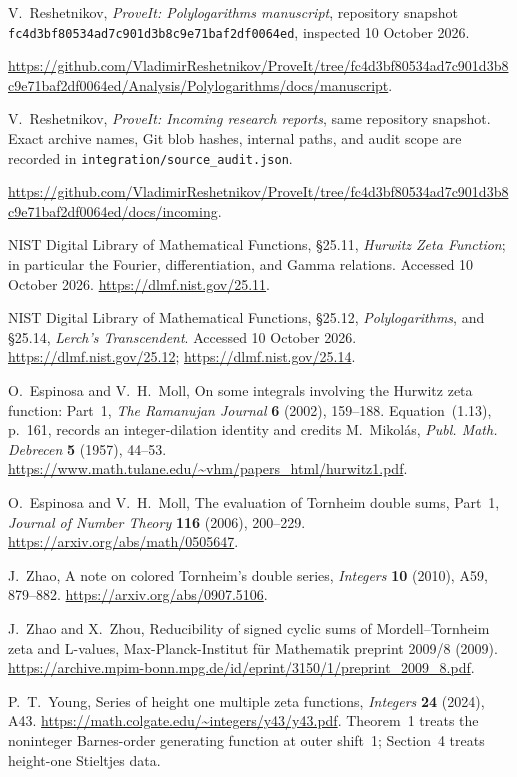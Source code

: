 V.~Reshetnikov, \emph{ProveIt: Polylogarithms manuscript}, repository
snapshot \nolinkurl{fc4d3bf80534ad7c901d3b8c9e71baf2df0064ed}, inspected
10 October 2026.\par
\url{https://github.com/VladimirReshetnikov/ProveIt/tree/fc4d3bf80534ad7c901d3b8c9e71baf2df0064ed/Analysis/Polylogarithms/docs/manuscript}.

V.~Reshetnikov, \emph{ProveIt: Incoming research reports}, same repository
snapshot.  Exact archive names, Git blob hashes, internal paths, and audit
scope are recorded in \nolinkurl{integration/source_audit.json}.\par
\url{https://github.com/VladimirReshetnikov/ProveIt/tree/fc4d3bf80534ad7c901d3b8c9e71baf2df0064ed/docs/incoming}.

NIST Digital Library of Mathematical Functions, \S25.11,
\emph{Hurwitz Zeta Function}; in particular the Fourier, differentiation,
and Gamma relations.  Accessed 10 October 2026.
\url{https://dlmf.nist.gov/25.11}.

NIST Digital Library of Mathematical Functions, \S25.12,
\emph{Polylogarithms}, and \S25.14, \emph{Lerch's Transcendent}.
Accessed 10 October 2026.
\url{https://dlmf.nist.gov/25.12};
\url{https://dlmf.nist.gov/25.14}.

O.~Espinosa and V.~H.~Moll,
On some integrals involving the Hurwitz zeta function: Part~1,
\emph{The Ramanujan Journal} \textbf{6} (2002), 159--188.
Equation~(1.13), p.~161, records an integer-dilation identity and credits
M.~Mikol\'as, \emph{Publ. Math. Debrecen} \textbf{5} (1957), 44--53.
\url{https://www.math.tulane.edu/~vhm/papers_html/hurwitz1.pdf}.

O.~Espinosa and V.~H.~Moll,
The evaluation of Tornheim double sums, Part~1,
\emph{Journal of Number Theory} \textbf{116} (2006), 200--229.
\url{https://arxiv.org/abs/math/0505647}.

J.~Zhao,
A note on colored Tornheim's double series,
\emph{Integers} \textbf{10} (2010), A59, 879--882.
\url{https://arxiv.org/abs/0907.5106}.

J.~Zhao and X.~Zhou,
Reducibility of signed cyclic sums of Mordell--Tornheim zeta and L-values,
Max-Planck-Institut f\"ur Mathematik preprint 2009/8 (2009).
\url{https://archive.mpim-bonn.mpg.de/id/eprint/3150/1/preprint_2009_8.pdf}.

P.~T.~Young,
Series of height one multiple zeta functions,
\emph{Integers} \textbf{24} (2024), A43.
\url{https://math.colgate.edu/~integers/y43/y43.pdf}.
Theorem~1 treats the noninteger Barnes-order generating function at
outer shift~1; Section~4 treats height-one Stieltjes data.

